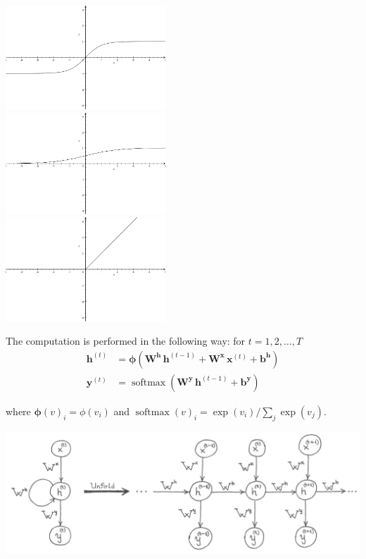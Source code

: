 \documentclass[titlepage]{report}
\DeclareMathOperator{\softmax}{softmax}
\begin{document}
\begin{center}
\includegraphics[width=60mm]{figures/tanh} \\
\includegraphics[width=60mm]{figures/sigma} \\
\includegraphics[width=60mm]{figures/relu}
\end{center}

\noindent
The computation is performed in the following way: for $t = 1, 2, \ldots, T$
\begin{align*}
\mathbf{h}^{(t)} &= \boldsymbol{\phi} \left( \mathbf{W}^{\mathbf{h}} \, \mathbf{h}^{(t - 1)} + \mathbf{W}^{\mathbf{x}} \, \mathbf{x}^{(t)} + \mathbf{b}^{\mathbf{h}} \right) \\
\mathbf{y}^{(t)} &= \softmax \left( \mathbf{W}^{\mathbf{y}} \, \mathbf{h}^{(t - 1)} + \mathbf{b}^{\mathbf{y}} \right)
\end{align*}

\noindent
where $\boldsymbol{\phi}(v)_i = \phi(v_i)$ and $\softmax(v)_i = \exp(v_i) / \sum_j \exp(v_j)$. 

\begin{center}
\includegraphics[width=150mm]{figures/rnn}
\end{center}
\end{document}
